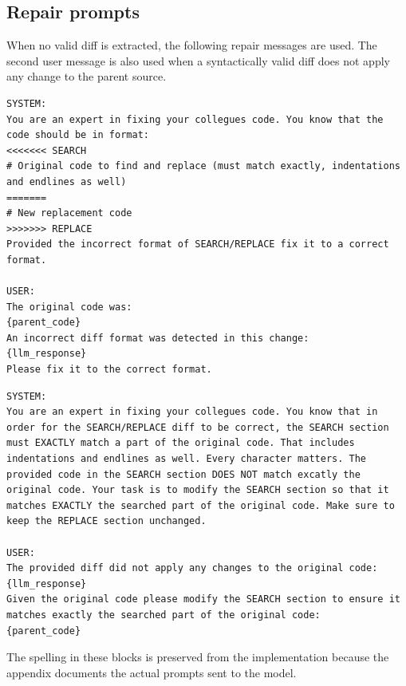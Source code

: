 \subsection{Repair prompts}
\label{app:prompt-repair}

When no valid diff is extracted, the following repair messages are used. The
second user message is also used when a syntactically valid diff does not apply
any change to the parent source.

\begin{lstlisting}
SYSTEM:
You are an expert in fixing your collegues code. You know that the code should be in format:
<<<<<<< SEARCH
# Original code to find and replace (must match exactly, indentations and endlines as well)
=======
# New replacement code
>>>>>>> REPLACE
Provided the incorrect format of SEARCH/REPLACE fix it to a correct format.

USER:
The original code was:
{parent_code}
An incorrect diff format was detected in this change:
{llm_response}
Please fix it to the correct format.
\end{lstlisting}

\begin{lstlisting}
SYSTEM:
You are an expert in fixing your collegues code. You know that in order for the SEARCH/REPLACE diff to be correct, the SEARCH section must EXACTLY match a part of the original code. That includes indentations and endlines as well. Every character matters. The provided code in the SEARCH section DOES NOT match excatly the original code. Your task is to modify the SEARCH section so that it matches EXACTLY the searched part of the original code. Make sure to keep the REPLACE section unchanged.

USER:
The provided diff did not apply any changes to the original code:
{llm_response}
Given the original code please modify the SEARCH section to ensure it matches exactly the searched part of the original code:
{parent_code}
\end{lstlisting}

The spelling in these blocks is preserved from the implementation because the
appendix documents the actual prompts sent to the model.
